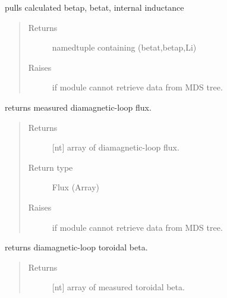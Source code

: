 \documentclass[letterpaper,10pt,english]{sphinxmanual}
\begin{document}
\begin{fulllineitems}
\begin{fulllineitems}
\label{\detokenize{eqtools:eqtools.EFIT.EFITTree.getBetas}}
pulls calculated betap, betat, internal inductance
\begin{quote}\begin{description}
\item[{Returns}] \leavevmode
namedtuple containing (betat,betap,Li)

\item[{Raises}] \leavevmode
{} \textendash{} if module cannot retrieve data from MDS tree.

\end{description}\end{quote}

\end{fulllineitems}


\begin{fulllineitems}
\label{\detokenize{eqtools:eqtools.EFIT.EFITTree.getDiamagFlux}}
returns measured diamagnetic-loop flux.
\begin{quote}\begin{description}
\item[{Returns}] \leavevmode
{[}nt{]} array of diamagnetic-loop flux.

\item[{Return type}] \leavevmode
Flux (Array)

\item[{Raises}] \leavevmode
{} \textendash{} if module cannot retrieve data from MDS tree.

\end{description}\end{quote}

\end{fulllineitems}


\begin{fulllineitems}
\label{\detokenize{eqtools:eqtools.EFIT.EFITTree.getDiamagBetaT}}
returns diamagnetic-loop toroidal beta.
\begin{quote}\begin{description}
\item[{Returns}] \leavevmode
{[}nt{]} array of measured toroidal beta.


\end{description}
\end{quote}
\end{fulllineitems}
\end{fulllineitems}
\end{document}

